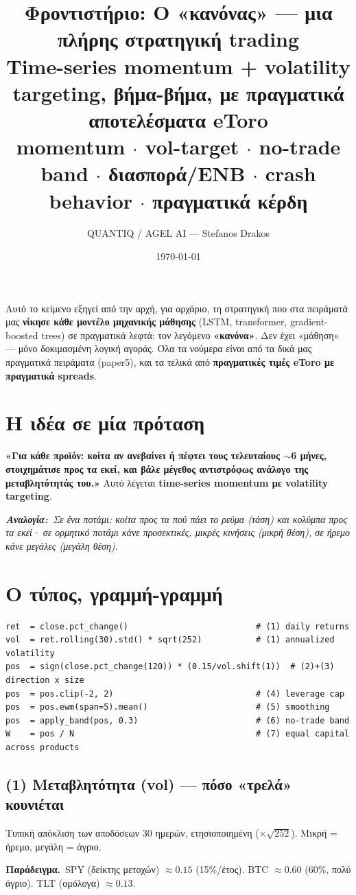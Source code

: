 \documentclass[11pt]{article}
\title{\textbf{Φροντιστήριο: Ο «κανόνας» — μια πλήρης στρατηγική trading}\\[3pt]
\large Time-series momentum + volatility targeting, βήμα-βήμα, με πραγματικά αποτελέσματα eToro\\[-1pt]
\normalsize\textcolor{accent}{momentum $\cdot$ vol-target $\cdot$ no-trade band $\cdot$ διασπορά/ENB $\cdot$ crash behavior $\cdot$ πραγματικά κέρδη}}
\author{QUANTIQ / AGEL AI --- Stefanos Drakos}\date{\today}
\newcommand{\ex}[1]{\par\smallskip\noindent\textbf{\textcolor{accent}{Παράδειγμα.}}\ #1\par\smallskip}
\newcommand{\analogy}[1]{\par\smallskip\noindent\textit{\textbf{Αναλογία:}\ #1}\par\smallskip}
\begin{document}
\maketitle\thispagestyle{empty}

\noindent Αυτό το κείμενο εξηγεί από την αρχή, για αρχάριο, τη στρατηγική που στα πειράματά μας
\textbf{νίκησε κάθε μοντέλο μηχανικής μάθησης} (LSTM, transformer, gradient-boosted trees) σε πραγματικά
λεφτά: τον λεγόμενο \textbf{«κανόνα»}. Δεν έχει «μάθηση» — μόνο δοκιμασμένη λογική αγοράς. Όλα τα νούμερα
είναι από τα δικά μας πραγματικά πειράματα (paper5), και τα τελικά από \textbf{πραγματικές τιμές eToro με
πραγματικά spreads}.

\tableofcontents
\bigskip

\section{Η ιδέα σε μία πρόταση}
\textbf{«Για κάθε προϊόν: κοίτα αν ανεβαίνει ή πέφτει τους τελευταίους $\sim$6 μήνες, στοιχημάτισε προς τα
εκεί, και βάλε μέγεθος αντιστρόφως ανάλογο της μεταβλητότητάς του.»} Αυτό λέγεται \textbf{time-series
momentum με volatility targeting}.
\analogy{Σε ένα ποτάμι: κοίτα προς τα πού πάει το ρεύμα (τάση) και κολύμπα προς τα εκεί· σε ορμητικό
ποτάμι κάνε προσεκτικές, μικρές κινήσεις (μικρή θέση), σε ήρεμο κάνε μεγάλες (μεγάλη θέση).}

\section{Ο τύπος, γραμμή-γραμμή}
\begin{verbatim}
ret  = close.pct_change()                          # (1) daily returns
vol  = ret.rolling(30).std() * sqrt(252)           # (1) annualized volatility
pos  = sign(close.pct_change(120)) * (0.15/vol.shift(1))  # (2)+(3) direction x size
pos  = pos.clip(-2, 2)                             # (4) leverage cap
pos  = pos.ewm(span=5).mean()                      # (5) smoothing
pos  = apply_band(pos, 0.3)                        # (6) no-trade band
W    = pos / N                                     # (7) equal capital across products
\end{verbatim}

\subsection{(1) Μεταβλητότητα (vol) --- πόσο «τρελά» κουνιέται}
Τυπική απόκλιση των αποδόσεων 30 ημερών, ετησιοποιημένη ($\times\sqrt{252}$). Μικρή = ήρεμο, μεγάλη = άγριο.
\ex{SPY (δείκτης μετοχών) $\approx 0.15$ (15\%/έτος). BTC $\approx 0.60$ (60\%, πολύ άγριο). TLT (ομόλογα) $\approx 0.13$.}
\end{document}
